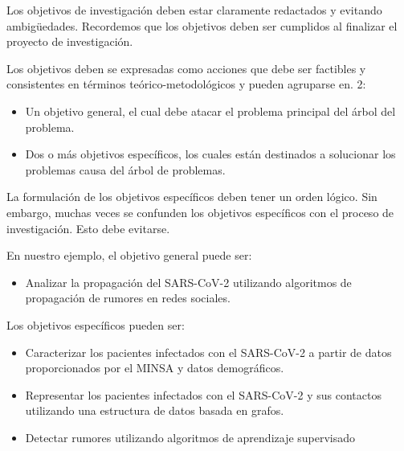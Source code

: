 Los objetivos de investigación deben estar claramente redactados y evitando ambigüedades. Recordemos que los objetivos deben ser cumplidos al finalizar el proyecto de investigación. 

Los objetivos deben se expresadas como acciones que debe ser factibles y consistentes en términos teórico-metodológicos y pueden agruparse en. 2:

\begin{itemize}
\item Un objetivo general, el cual debe atacar el problema principal del árbol del problema.
\item Dos o más objetivos específicos, los cuales están destinados a solucionar los problemas causa del árbol de problemas.
\end{itemize}

La formulación de los objetivos específicos deben tener un orden lógico. Sin embargo, muchas veces se confunden los objetivos específicos con el proceso de investigación. Esto debe evitarse.

En nuestro ejemplo, el objetivo general puede ser:

\begin{itemize}
\item Analizar la propagación del SARS-CoV-2 utilizando algoritmos de propagación de rumores en redes sociales.
\end{itemize}

Los objetivos específicos pueden ser:

\begin{itemize}
\item Caracterizar los pacientes infectados con el SARS-CoV-2 a partir de datos proporcionados por el MINSA y datos demográficos.
\item Representar los pacientes infectados con el SARS-CoV-2 y sus contactos utilizando una estructura de datos basada en grafos.
\item Detectar rumores utilizando algoritmos de aprendizaje supervisado
\end{itemize}